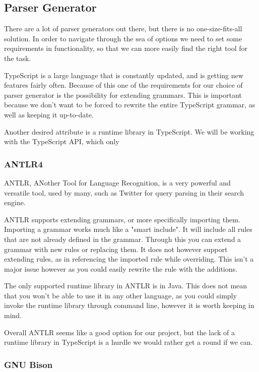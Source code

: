 \subsection{Parser Generator}\label{subsec:parser-generator}

There are a lot of parser generators out there, but there is no one-size-fits-all solution.
In order to navigate through the sea of options we need to set some requirements in functionality, so that we can more easily find the right tool for the task.

TypeScript is a large language that is constantly updated, and is getting new features fairly often.
Because of this one of the requirements for our choice of parser generator is the possibility for extending grammars.
This is important because we don't want to be forced to rewrite the entire TypeScript grammar, as well as keeping it up-to-date.

Another desired attribute is a runtime library in TypeScript.
We will be working with the TypeScript API, which only


\subsubsection{ANTLR4}\label{subsubsec:antlr}

ANTLR, ANother Tool for Language Recognition, is a very powerful and versatile tool, used by many, such as Twitter for query parsing in their search engine\cite{Terence2012}.

ANTLR supports extending grammars, or more specifically importing them.
Importing a grammar works much like a "smart include".
It will include all rules that are not already defined in the grammar.
Through this you can extend a grammar with new rules or replacing them.
It does not however support extending rules, as in referencing the imported rule while overriding\cite{Terence2012}.
This isn't a major issue however as you could easily rewrite the rule with the additions.

The only supported runtime library in ANTLR is in Java.
This does not mean that you won't be able to use it in any other language, as you could simply invoke the runtime library through command line, however it is worth keeping in mind.

Overall ANTLR seems like a good option for our project, but the lack of a runtime library in TypeScript is a hurdle we would rather get a round if we can.

\subsubsection{GNU Bison}\label{subsubsec:bison}




